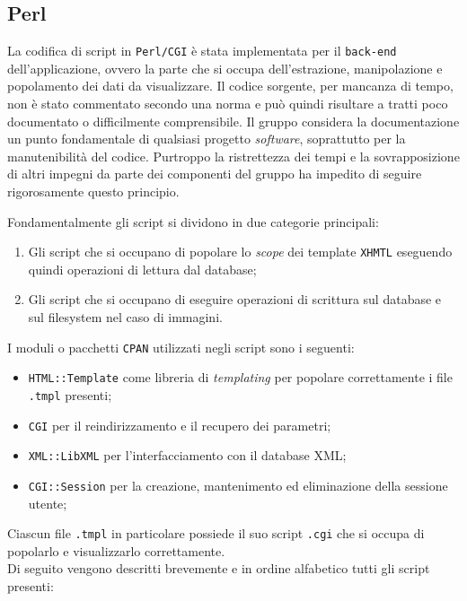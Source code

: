 \subsection{Perl}

La codifica di script in \texttt{Perl/CGI} è stata implementata per il \texttt{back-end} dell'applicazione, ovvero la parte che si occupa dell'estrazione, manipolazione e popolamento dei dati da visualizzare. Il codice sorgente, per mancanza di tempo, non è stato commentato secondo una norma e può quindi risultare a tratti poco documentato o difficilmente comprensibile. Il gruppo considera la documentazione un punto fondamentale di qualsiasi progetto \textit{software}, soprattutto per la manutenibilità del codice. Purtroppo la ristrettezza dei tempi e la sovrapposizione di altri impegni da parte dei componenti del gruppo ha impedito di seguire rigorosamente questo principio.

Fondamentalmente gli script si dividono in due categorie principali:

\begin{enumerate}

	\item Gli script che si occupano di popolare lo \textit{scope} dei template \texttt{XHMTL} eseguendo quindi operazioni di lettura dal database;
	\item Gli script che si occupano di eseguire operazioni di scrittura sul database e sul filesystem nel caso di immagini.

\end{enumerate}

I moduli o pacchetti \texttt{CPAN} utilizzati negli script sono i seguenti:

\begin{itemize}

	\item \texttt{HTML::Template} come libreria di \textit{templating} per popolare correttamente i file \texttt{.tmpl} presenti;
	\item \texttt{CGI} per il reindirizzamento e il recupero dei parametri;
	\item \texttt{XML::LibXML} per l'interfacciamento con il database XML;
	\item \texttt{CGI::Session} per la creazione, mantenimento ed eliminazione della sessione utente; 
\end{itemize}
Ciascun file \texttt{.tmpl} in particolare possiede il suo script \texttt{.cgi} che si occupa di popolarlo e visualizzarlo correttamente. \\
Di seguito vengono descritti brevemente e in ordine alfabetico tutti gli script presenti:

